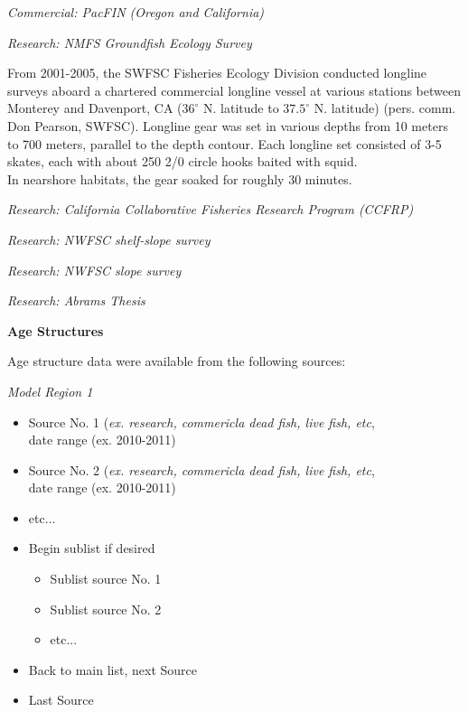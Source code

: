 \documentclass[12pt,]{article}
\begin{document}
\emph{Commercial: PacFIN (Oregon and California)}

\emph{Research: NMFS Groundfish Ecology Survey}

From 2001-2005, the SWFSC Fisheries Ecology Division conducted longline
surveys aboard a chartered commercial longline vessel at various
stations between Monterey and Davenport, CA (\(36^\circ\) N. latitude to
\(37.5^\circ\) N. latitude) (pers. comm. Don Pearson, SWFSC). Longline
gear was set in various depths from 10 meters to 700 meters, parallel to
the depth contour. Each longline set consisted of 3-5 skates, each with
about 250 2/0 circle hooks baited with squid.\\
In nearshore habitats, the gear soaked for roughly 30 minutes.

\emph{Research: California Collaborative Fisheries Research Program
(CCFRP)}

\emph{Research: NWFSC shelf-slope survey}

\emph{Research: NWFSC slope survey}

\emph{Research: Abrams Thesis}

\vspace{.5cm}

\textbf{Age Structures}

Age structure data were available from the following sources:

\emph{Model Region 1}

\begin{itemize}[noitemsep,nolistsep,topsep=0pt]
  \item Source No. 1 (\emph{ex. research, commericla dead fish, live fish, etc},\\ 
        date range (ex. 2010-2011)
  \item Source No. 2 (\emph{ex. research, commericla dead fish, live fish, etc},\\
        date range (ex. 2010-2011) 
  \item etc...      
  \item Begin sublist if desired 
    \begin{itemize}[noitemsep,nolistsep]
      \item Sublist source No. 1     
      \item Sublist source No. 2        
      \item etc...     
    \end{itemize}
  \item Back to main list, next Source     
  \item Last Source     
\end{itemize}
\end{document}
